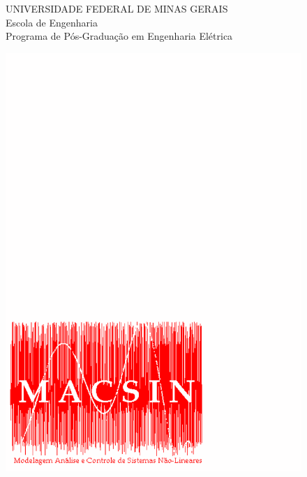 \begin{titlepage}

\begin{figure}[!ht]
\begin{minipage}[b]{0.6\linewidth}
\begin{normalsize}
UNIVERSIDADE FEDERAL DE MINAS GERAIS\\
Escola de Engenharia\\
Programa de Pós-Graduação em Engenharia Elétrica\\
\end{normalsize}
\end{minipage}\hfill
\begin{minipage}[c]{0.4\linewidth}
\begin{flushright}
\vspace{-1cm}
\includegraphics[scale=0.3,trim=0mm 3mm 65mm 188mm,clip=true]{figuras/macsin.pdf}
\end{flushright}
\end{minipage}
\end{figure}


\end{titlepage}
